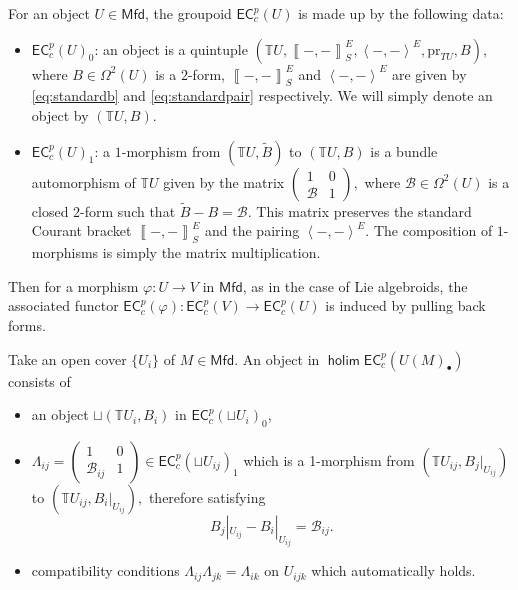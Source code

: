 \documentclass[letterpaper,10pt, oneside]{article} %
\newcommand{\calc}[1]{} %
\newcommand{\Mfd}{\mathsf{Mfd}}%
\newcommand{\ecalgdp}{\mathsf{EC}^{p}_{c}} %
\DeclareMathOperator{\holim}{\mathsf{holim}}
\newcommand{\tangu}{{\mathbb{T} U}}
\newcommand{\tangui}{{\mathbb{T} U_i}}
\newcommand{\tanguij}{{\mathbb{T} U_{ij}}}
\newcommand{\huaB}{\mathcal{B}}%
\newcommand{\pair}[1]{\left\langle #1\right\rangle}
\newcommand{\Courant}[1]{\left\llbracket  #1\right\rrbracket }
\newcommand{\pr}{\mathrm{pr}}
\begin{document}
For an object $U\in \Mfd$, the groupoid $\ecalgdp(U)$ is made up
by the following data:
\begin{itemize}
\item{$\ecalgdp(U)_0$}: an object is a quintuple $(\tangu, \Courant{-,-}^E_S,  \pair{-,-}^E,\pr_{TU}, B)$, where $B\in \Omega^2(U)$ is a $2$-form,  $\Courant{-,-}^E_S$ and
  $\pair{-,-}^E$ are  given by \eqref{eq:standardb} and \eqref{eq:standardpair} respectively. We will simply denote an object by $(\tangu,B)$.

\item{$\ecalgdp(U)_1$}:  a $1$-morphism from $(\tangu,  \widetilde{B})$ to $ (\tangu,B) $ is a bundle automorphism of $\tangu$ given by the
  matrix
$
\left(\begin{array}{cc}
1&0\\
\huaB&1
\end{array} \right),
$ where $\huaB\in \Omega^2(U)$ is a closed $2$-form such that $\widetilde{B}-B=\huaB$.
This matrix preserves the standard Courant bracket $\Courant{-,-}^E_S$ and the pairing
$\pair{-,-}^E$. The
composition of $1$-morphisms is simply the matrix multiplication.



\end{itemize}
Then for a morphism $\varphi: U\to V$ in $\Mfd$, as in the case of Lie algebroids, the associated
functor $\ecalgdp(\varphi): \ecalgdp(V) \to \ecalgdp(U)$ is induced by
pulling back forms.\calc{, more precisely, on the level of objects,
\[\ecalgdp(\varphi)(TV\oplus T^*V, \Courant{-,-}^E_S,  \pair{-,-}^E,\pr_{TV}, B_V)
= (\tangu, \Courant{-,-}^E_S,  \pair{-,-}^E,\pr_{TU}, \varphi^*B_V),\]
and on the level of morphisms,
\[
\ecalgdp(\varphi) \left(\begin{array}{cc}
1&0\\
\huaB_V&1
\end{array} \right) = \left(\begin{array}{cc}
1&0\\
\varphi^*\huaB_V&1
\end{array} \right) .
\]
One may verify that $\ecalgdp(\varphi)$ is indeed a functor between
desired categories.}

\vspace{3mm}
Take an open cover $\{U_i\}$ of $M\in
\Mfd$. An object in $\holim \ecalgdp(U(M)_\bullet)$ consists of
\begin{itemize}
\item  an object $\sqcup (\tangui,B_i)$ in $\ecalgdp(\sqcup U_i)_0$,

\item  $\Lambda_{ij}=\left(\begin{array}{cc}
1&0\\
\huaB_{ij}&1
\end{array} \right) \in \ecalgdp(\sqcup U_{ij})_1$ which is a 1-morphism from
$
(\tanguij,
 B_j|_{U_{ij}})
  $
  to
   $
   (\tanguij, B_i|_{U_{ij}}),
$
therefore satisfying
$$
B_j|_{U_{ij}}-B_i|_{U_{ij}}=\huaB_{ij}.
$$
\item compatibility conditions $\Lambda_{ij}\Lambda_{jk}=\Lambda_{ik}$ on $U_{ijk}$ which automatically holds.
\end{itemize}
\end{document}
